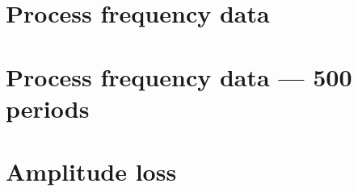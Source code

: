 \section{Process frequency data}\label{sec:process-freq}

\section{Process frequency data --- 500 periods} \label{sec:process-freq-500}

\section{Amplitude loss} \label{sec:amplitude-loss}
